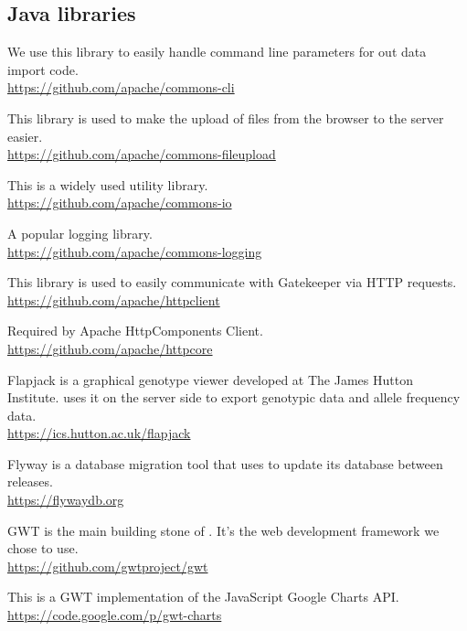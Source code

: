\subsection{Java libraries}
\begin{description}[align=left,style=nextline,leftmargin=*,labelsep=\parindent,font=\bfseries]
	\item[Apache Commons CLI] We use this library to easily handle command line parameters for out data import code. \\\url{https://github.com/apache/commons-cli}
	\item[Apache Commons FileUpload] This library is used to make the upload of files from the browser to the server easier. \\\url{https://github.com/apache/commons-fileupload}
	\item[Apache Commons IO] This is a widely used utility library. \\\url{https://github.com/apache/commons-io}
	\item[Apache Commons Logging] A popular logging library. \\\url{https://github.com/apache/commons-logging}
	\item[Apache HttpComponents Client] This library is used to easily communicate with Gatekeeper via HTTP requests. \\\url{https://github.com/apache/httpclient}
	\item[Apache HttpComponents Core] Required by Apache HttpComponents Client. \\\url{https://github.com/apache/httpcore}
	\item[Flapjack] Flapjack is a graphical genotype viewer developed at The James Hutton Institute. {\germinate} uses it on the server side to export genotypic data and allele frequency data. \\\url{https://ics.hutton.ac.uk/flapjack}
	\item[Flyway] Flyway is a database migration tool that {\germinate} uses to update its database between releases.
	\\\url{https://flywaydb.org}
	\item[GWT] GWT is the main building stone of {\germinate}. It's the web development framework we chose to use. \\\url{https://github.com/gwtproject/gwt}
	\item[GWT-Charts] This is a GWT implementation of the JavaScript Google Charts API. \\\url{https://code.google.com/p/gwt-charts}

\end{description}
